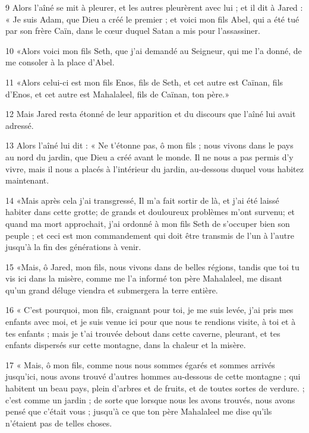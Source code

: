 \par 9 Alors l'aîné se mit à pleurer, et les autres pleurèrent avec lui ; et il dit à Jared : « Je suis Adam, que Dieu a créé le premier ; et voici mon fils Abel, qui a été tué par son frère Caïn, dans le cœur duquel Satan a mis pour l'assassiner.

\par 10 «Alors voici mon fils Seth, que j'ai demandé au Seigneur, qui me l'a donné, de me consoler à la place d'Abel.

\par 11 «Alors celui-ci est mon fils Enos, fils de Seth, et cet autre est Caïnan, fils d'Enos, et cet autre est Mahalaleel, fils de Caïnan, ton père.»

\par 12 Mais Jared resta étonné de leur apparition et du discours que l'aîné lui avait adressé.

\par 13 Alors l'aîné lui dit : « Ne t'étonne pas, ô mon fils ; nous vivons dans le pays au nord du jardin, que Dieu a créé avant le monde. Il ne nous a pas permis d'y vivre, mais il nous a placés à l'intérieur du jardin, au-dessous duquel vous habitez maintenant.

\par 14 «Mais après cela j'ai transgressé, Il m'a fait sortir de là, et j'ai été laissé habiter dans cette grotte; de ​​grands et douloureux problèmes m'ont survenu; et quand ma mort approchait, j'ai ordonné à mon fils Seth de s'occuper bien son peuple ; et ceci est mon commandement qui doit être transmis de l'un à l'autre jusqu'à la fin des générations à venir.

\par 15 «Mais, ô Jared, mon fils, nous vivons dans de belles régions, tandis que toi tu vis ici dans la misère, comme me l'a informé ton père Mahalaleel, me disant qu'un grand déluge viendra et submergera la terre entière.

\par 16 « C'est pourquoi, mon fils, craignant pour toi, je me suis levée, j'ai pris mes enfants avec moi, et je suis venue ici pour que nous te rendions visite, à toi et à tes enfants ; mais je t'ai trouvée debout dans cette caverne, pleurant, et tes enfants dispersés sur cette montagne, dans la chaleur et la misère.

\par 17 « Mais, ô mon fils, comme nous nous sommes égarés et sommes arrivés jusqu'ici, nous avons trouvé d'autres hommes au-dessous de cette montagne ; qui habitent un beau pays, plein d'arbres et de fruits, et de toutes sortes de verdure. ; c'est comme un jardin ; de sorte que lorsque nous les avons trouvés, nous avons pensé que c'était vous ; jusqu'à ce que ton père Mahalaleel me dise qu'ils n'étaient pas de telles choses.

